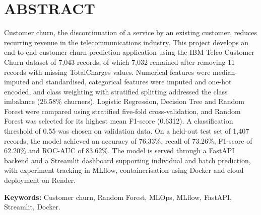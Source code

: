 \chapter*{\centering ABSTRACT}

\noindent Customer churn, the discontinuation of a service by an existing customer, reduces recurring revenue in the telecommunications industry. This project develops an end-to-end customer churn prediction application using the IBM Telco Customer Churn dataset of 7,043 records, of which 7,032 remained after removing 11 records with missing TotalCharges values. Numerical features were median-imputed and standardised, categorical features were imputed and one-hot encoded, and class weighting with stratified splitting addressed the class imbalance (26.58\% churners). Logistic Regression, Decision Tree and Random Forest were compared using stratified five-fold cross-validation, and Random Forest was selected for its highest mean F1-score (0.6312). A classification threshold of 0.55 was chosen on validation data. On a held-out test set of 1,407 records, the model achieved an accuracy of 76.33\%, recall of 73.26\%, F1-score of 62.20\% and ROC-AUC of 83.62\%. The model is served through a FastAPI backend and a Streamlit dashboard supporting individual and batch prediction, with experiment tracking in MLflow, containerisation using Docker and cloud deployment on Render.

\vspace{0.5cm}
\noindent\textbf{Keywords:} Customer churn, Random Forest, MLOps, MLflow, FastAPI, Streamlit, Docker.